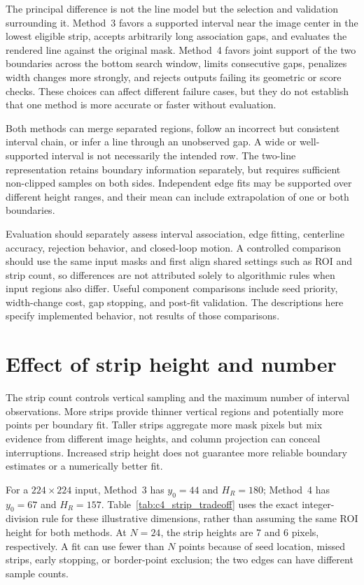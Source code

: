 The principal difference is not the line model but the selection and
validation surrounding it. Method~3 favors a supported interval near the
image center in the lowest eligible strip, accepts arbitrarily long
association gaps, and evaluates the rendered line against the original
mask. Method~4 favors joint support of the two boundaries across the
bottom search window, limits consecutive gaps, penalizes width changes
more strongly, and rejects outputs failing its geometric or score checks.
These choices can affect different failure cases, but they do not establish
that one method is more accurate or faster without evaluation.

Both methods can merge separated regions, follow an incorrect but
consistent interval chain, or infer a line through an unobserved gap.
A wide or well-supported interval is not necessarily the intended row.
The two-line representation retains boundary information separately,
but requires sufficient non-clipped samples on both sides. Independent
edge fits may be supported over different height ranges, and their mean
can include extrapolation of one or both boundaries.

Evaluation should separately assess interval association, edge fitting,
centerline accuracy, rejection behavior, and closed-loop motion.
A controlled comparison should use the same input masks and first align
shared settings such as ROI and strip count, so differences are not
attributed solely to algorithmic rules when input regions also differ.
Useful component comparisons include seed priority, width-change cost,
gap stopping, and post-fit validation. The descriptions here specify
implemented behavior, not results of those comparisons.

\section{Effect of strip height and number}
\label{sec:c4_strip_height}

The strip count controls vertical sampling and the maximum number of
interval observations. More strips provide thinner vertical regions and
potentially more points per boundary fit. Taller strips aggregate more
mask pixels but mix evidence from different image heights, and column
projection can conceal interruptions. Increased strip height does not
guarantee more reliable boundary estimates or a numerically better fit.

For a $224\times224$ input, Method~3 has $y_0=44$ and $H_R=180$;
Method~4 has $y_0=67$ and $H_R=157$. Table~\ref{tab:c4_strip_tradeoff}
uses the exact integer-division rule for these illustrative dimensions,
rather than assuming the same ROI height for both methods. At $N=24$,
the strip heights are 7 and 6 pixels, respectively. A fit can use fewer
than $N$ points because of seed location, missed strips, early stopping,
or border-point exclusion; the two edges can have different sample counts.

